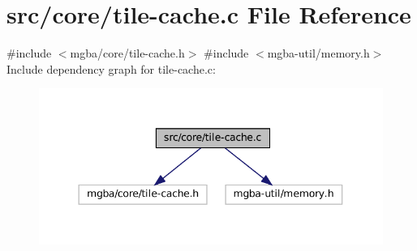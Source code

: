 \hypertarget{tile-cache_8c}{}\section{src/core/tile-\/cache.c File Reference}
\label{tile-cache_8c}
{\ttfamily \#include $<$mgba/core/tile-\/cache.\+h$>$}\newline
{\ttfamily \#include $<$mgba-\/util/memory.\+h$>$}\newline
Include dependency graph for tile-\/cache.c\+:
\nopagebreak
\begin{figure}[H]
\begin{center}
\leavevmode
\includegraphics[width=344pt]{tile-cache_8c__incl}
\end{center}
\end{figure}
